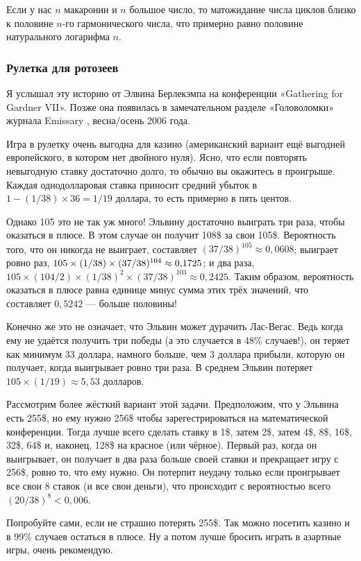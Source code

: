 Если у нас $n$ макаронин и $n$ большое число, то матожидание числа циклов близко к половине $n$-го гармонического числа, что примерно равно половине натурального логарифма $n$.

\subsubsection*{Рулетка для ротозеев}

Я услышал эту историю от Элвина Берлекэмпа на конференции
«Gathering for Gardner VII».
Позже она появилась в замечательном разделе «Головоломки» журнала Emissary \cite{berlekamp-buhle}, весна/осень 2006 года.

Игра в рулетку очень выгодна для казино (американский вариант ещё выгодней европейского, в котором нет двойного нуля).
Ясно, что если повторять невыгодную ставку достаточно долго, то обычно вы окажитесь в проигрыше.
Каждая однодолларовая ставка приносит средний убыток в  $1 - (1/38) \times 36 = 1/19$ доллара, то есть примерно в пять центов.

Однако 105 это не так уж много!
Эльвину достаточно выиграть три раза, чтобы оказаться в плюсе.
В этом случае он получит 108\$ за свои 105\$.
Вероятность того, что он никогда не выиграет, составляет $(37/38)^{105} \approx 0{,}0608$;
выиграет ровно раз, $105 \times (1/38) \times (37/38)^{104} \z\approx 0{,}1725$;
и два раза, $105 \times (104/2) \times (1/38)^2 \times (37/38)^{103} \approx 0{,}2425$.
Таким образом, вероятность оказаться в плюсе равна единице минус сумма этих трёх значений, что составляет $0{,}5242$ --- больше половины!

Конечно же это не означает, что Эльвин может дурачить Лас-Вегас.
Ведь когда ему не удаётся получить три победы (а это случается в 48\% случаев!), он теряет как минимум 33 доллара, намного больше, чем 3 доллара прибыли, которую он получает, когда выигрывает ровно три раза.
В среднем Эльвин потеряет $105 \times (1/19) \approx 5{,}53$ долларов.

Рассмотрим более жёсткий вариант этой задачи.
Предположим, что у Эльвина есть 255\$, но ему нужно 256\$ чтобы зарегестрироваться на математической конференции.
Тогда лучше всего сделать ставку в 1\$, затем 2\$, затем 4\$, 8\$, 16\$, 32\$, 64\$ и, наконец, 128\$ на красное (или чёрное).
Первый раз, когда он выигрывает, он получает в два раза больше своей ставки и прекращает игру с 256\$, ровно то, что ему нужно.
Он потерпит неудачу только если проигрывает все свои $8$ ставок (и все свои деньги), что происходит с вероятностью всего $(20/38)^8 < 0{,}006$.

Попробуйте сами, если не страшно потерять 255\$.
Так можно посетить казино и в 99\% случаев остаться в плюсе.
Ну а потом лучше бросить играть в азартные игры, очень рекомендую.
